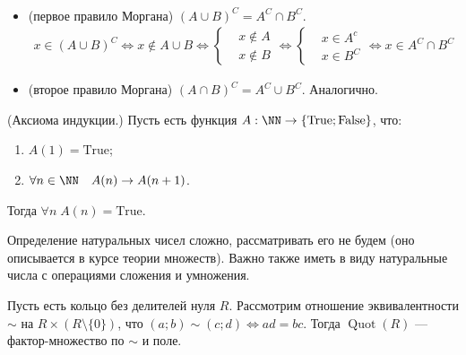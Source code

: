 \documentclass[12pt,a4paper]{article}
\DeclareMathOperator{\Quot}{Quot}
\newcommand{\True}{\mathrm{True}}
\newcommand{\False}{\mathrm{False}}
\begin{document}
    \begin{corollary*}\ 
        \begin{itemize}
            \item (первое правило Моргана) $(A\cup B)^C = A^C \cap B^C$.
                \begin{align*}
                    x\in (A\cup B)^C \Leftrightarrow
                    x \notin A \cup B \Leftrightarrow
                    \left\{ \begin{aligned}
                        &x \notin A\\
                        &x \notin B
                    \end{aligned}\right. \Leftrightarrow
                    \left\{ \begin{aligned}
                        &x \in A^c\\
                        &x \in B^C
                    \end{aligned} \right. \Leftrightarrow
                    x \in A^C \cap B^C
                \end{align*}
            \item (второе правило Моргана) $(A\cap B)^C = A^C \cup B^C$. Аналогично.
        \end{itemize}
    \end{corollary*}

    \begin{definition}
        (Аксиома индукции.) Пусть есть функция $A: \NN \to \{\True; \False\}$, что:
        \begin{multicols}{2}
            \begin{enumerate}
                \item $A(1) = \True$;
                \item $\forall n \in \NN\quad A(n) \rightarrow A(n+1)$.
            \end{enumerate}
        \end{multicols}
        Тогда $\forall n\; A(n) = \True$.
    \end{definition}

    Определение натуральных чисел сложно, рассматривать его не будем (оно описывается в курсе теории множеств). Важно также иметь в виду натуральные числа с операциями сложения и умножения.

    \begin{definition}
        Пусть есть кольцо без делителей нуля $R$. Рассмотрим отношение эквивалентности $\sim$ на $R \times (R\setminus \{0\})$, что $(a; b) \sim (c; d) \Leftrightarrow ad = bc$. Тогда $\Quot(R)$ --- фактор-множество по $\sim$ и поле.
    \end{definition}
\end{document}
